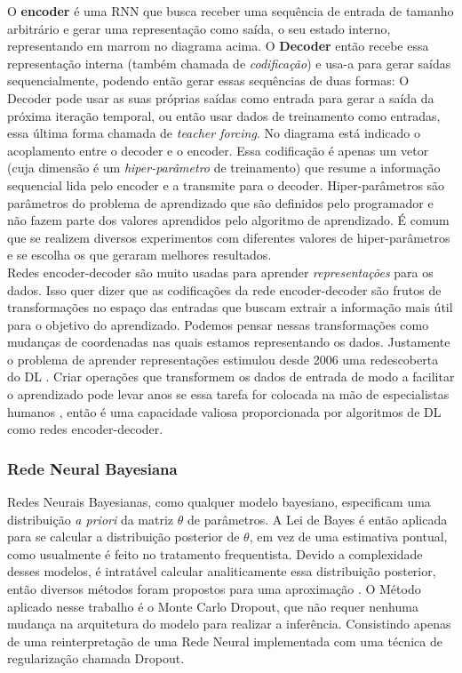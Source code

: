 O \textbf{encoder} é uma RNN que busca receber uma sequência de entrada de
tamanho arbitrário e gerar uma representação como saída, o seu estado interno,
representando em marrom no diagrama acima. O \textbf{Decoder} então recebe essa representação interna (também chamada
de \textit{codificação}) e usa-a para gerar saídas sequencialmente, podendo
então gerar essas sequências de duas formas: O Decoder pode usar as suas próprias saídas
como entrada para gerar a saída da próxima iteração temporal, ou então usar dados de treinamento como
entradas, essa última forma chamada de \textit{teacher forcing}. No diagrama
está indicado o acoplamento entre o decoder e o encoder. Essa codificação é apenas
um vetor (cuja dimensão é um \textit{hiper-parâmetro} de treinamento) que resume a
informação sequencial lida pelo encoder e a transmite para o decoder.
Hiper-parâmetros são parâmetros do problema de aprendizado que são definidos
pelo programador e não fazem parte dos valores aprendidos pelo algoritmo de
aprendizado. É comum que se realizem diversos experimentos com diferentes
valores de hiper-parâmetros e se escolha os que geraram melhores resultados. 
\\

Redes encoder-decoder são muito usadas para aprender \textit{representações} para os
dados. Isso quer dizer que as codificações da rede encoder-decoder são frutos de
transformações no espaço das entradas que buscam extrair a informação mais útil
para o objetivo do aprendizado. Podemos pensar nessas transformações como
mudanças de coordenadas nas quais estamos representando os dados. Justamente o problema de aprender
representações estimulou desde 2006 uma redescoberta do DL \citep{dlbook}. Criar
operações que transformem os dados de entrada de modo a facilitar o aprendizado
pode levar anos se essa tarefa for colocada na mão de especialistas humanos
\citep{dlbook}, então é uma capacidade valiosa proporcionada por algoritmos de
DL como redes encoder-decoder. \\





\subsubsection{Rede Neural Bayesiana}

Redes Neurais Bayesianas, como qualquer modelo bayesiano, especificam uma distribuição \textit{a priori} da matriz $\theta$ de parâmetros.
A Lei de Bayes é então aplicada para se calcular a distribuição posterior de
$\theta$, em vez de uma estimativa pontual, como usualmente é feito no tratamento frequentista.
Devido a complexidade desses modelos, é intratável calcular analiticamente essa distribuição posterior, então diversos métodos foram propostos para uma aproximação \citep{Gal2016Uncertainty}.
O Método aplicado nesse trabalho é o Monte Carlo Dropout, que não requer nenhuma mudança na arquitetura do modelo para realizar a inferência. Consistindo apenas de uma reinterpretação de uma Rede Neural implementada com uma técnica de regularização chamada Dropout. 

